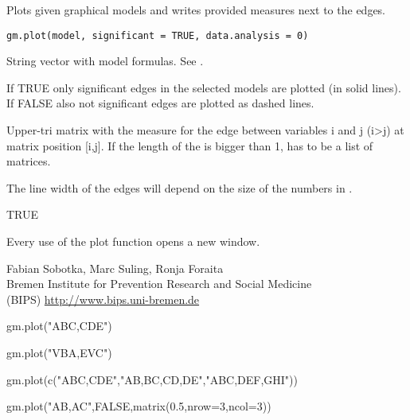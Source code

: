 \begin{Description}\relax
Plots given graphical models and writes provided measures next to the edges.
\end{Description}
\begin{Usage}
\begin{verbatim}
gm.plot(model, significant = TRUE, data.analysis = 0)
\end{verbatim}
\end{Usage}
\begin{Arguments}
\begin{ldescription}
\item[\code{model}] String vector with model formulas. See . 
\item[\code{significant}] If TRUE only significant edges in the selected models are plotted (in solid lines). If FALSE also not significant edges are plotted as dashed lines.

\item[\code{data.analysis}] Upper-tri matrix with the measure for the edge between variables i and j (i>j) at matrix position [i,j]. If the length of the  is bigger than 1,  has to be a list of matrices. 
\end{ldescription}
\end{Arguments}
\begin{Details}\relax
The line width of the edges will depend on the size of the numbers in .
\end{Details}
\begin{Value}
TRUE
\end{Value}
\begin{Note}\relax
Every use of the plot function opens a new window.
\end{Note}
\begin{Author}\relax
Fabian Sobotka, Marc Suling, Ronja Foraita \\
Bremen Institute for Prevention Research and Social Medicine \\
(BIPS)  \url{http://www.bips.uni-bremen.de}
\end{Author}
\begin{SeeAlso}\relax
{}
\end{SeeAlso}
\begin{Examples}
\begin{ExampleCode}
  gm.plot("ABC,CDE")

  gm.plot("VBA,EVC")
  
  gm.plot(c("ABC,CDE","AB,BC,CD,DE","ABC,DEF,GHI"))
  
  gm.plot("AB,AC",FALSE,matrix(0.5,nrow=3,ncol=3))
\end{ExampleCode}
\end{Examples}

